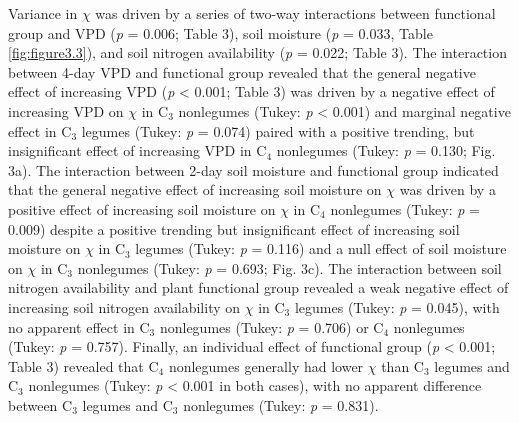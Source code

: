 Variance in $\chi$ was driven by a series of two-way interactions between functional group and VPD (\textit{p} = 0.006; Table 3), soil moisture (\textit{p} = 0.033, Table \ref{fig:figure3.3}), and soil nitrogen availability (\textit{p} = 0.022; Table 3). The interaction between 4-day VPD and functional group revealed that the general negative effect of increasing VPD (\textit{p} < 0.001; Table 3) was driven by a negative effect of increasing VPD on $\chi$ in C$_3$ nonlegumes (Tukey: \textit{p} < 0.001) and marginal negative effect in C$_3$ legumes (Tukey: \textit{p} = 0.074) paired with a positive trending, but insignificant effect of increasing VPD in C$_4$ nonlegumes (Tukey: \textit{p} = 0.130; Fig. 3a). The interaction between 2-day soil moisture and functional group indicated that the general negative effect of increasing soil moisture on $\chi$ was driven by a positive effect of increasing soil moisture on $\chi$ in C$_4$ nonlegumes (Tukey: \textit{p} = 0.009) despite a positive trending but insignificant effect of increasing soil moisture on $\chi$ in C$_3$ legumes (Tukey: \textit{p} = 0.116) and a null effect of soil moisture on $\chi$ in C$_3$ nonlegumes (Tukey: \textit{p} = 0.693; Fig. 3c). The interaction between soil nitrogen availability and plant functional group revealed a weak negative effect of increasing soil nitrogen availability on $\chi$ in C$_3$ legumes (Tukey: \textit{p} = 0.045), with no apparent effect in C$_3$ nonlegumes (Tukey: \textit{p} = 0.706) or C$_4$ nonlegumes (Tukey: \textit{p} = 0.757). Finally, an individual effect of functional group (\textit{p} < 0.001; Table 3) revealed that C$_4$ nonlegumes generally had lower $\chi$ than C$_3$ legumes and C$_3$ nonlegumes (Tukey: \textit{p} < 0.001 in both cases), with no apparent difference between C$_3$ legumes and C$_3$ nonlegumes (Tukey: \textit{p} = 0.831).

